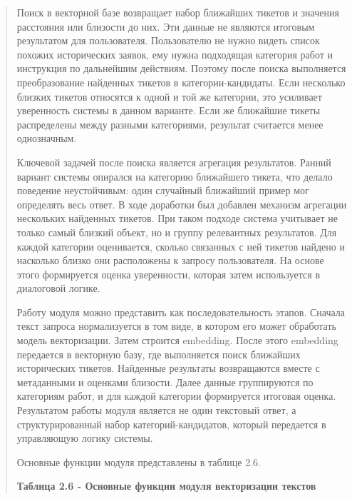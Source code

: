 \documentclass[
]{article}
\begin{document}
\begin{quote}
Поиск в векторной базе возвращает набор ближайших тикетов и значения
расстояния или близости до них. Эти данные не являются итоговым
результатом для пользователя. Пользователю не нужно видеть список
похожих исторических заявок, ему нужна подходящая категория работ и
инструкция по дальнейшим действиям. Поэтому после поиска выполняется
преобразование найденных тикетов в категории-кандидаты. Если несколько
близких тикетов относятся к одной и той же категории, это усиливает
уверенность системы в данном варианте. Если же ближайшие тикеты
распределены между разными категориями, результат считается менее
однозначным.

Ключевой задачей после поиска является агрегация результатов. Ранний
вариант системы опирался на категорию ближайшего тикета, что делало
поведение неустойчивым: один случайный ближайший пример мог определять
весь ответ. В ходе доработки был добавлен механизм агрегации нескольких
найденных тикетов. При таком подходе система учитывает не только самый
близкий объект, но и группу релевантных результатов. Для каждой
категории оценивается, сколько связанных с ней тикетов найдено и
насколько близко они расположены к запросу пользователя. На основе этого
формируется оценка уверенности, которая затем используется в диалоговой
логике.

Работу модуля можно представить как последовательность этапов. Сначала
текст запроса нормализуется в том виде, в котором его может обработать
модель векторизации. Затем строится embedding. После этого embedding
передается в векторную базу, где выполняется поиск ближайших
исторических тикетов. Найденные результаты возвращаются вместе с
метаданными и оценками близости. Далее данные группируются по категориям
работ, и для каждой категории формируется итоговая оценка. Результатом
работы модуля является не один текстовый ответ, а структурированный
набор категорий-кандидатов, который передается в управляющую логику
системы.

Основные функции модуля представлены в таблице 2.6.

\textbf{Таблица 2.6 - Основные функции модуля векторизации текстов}
\end{quote}
\end{document}
